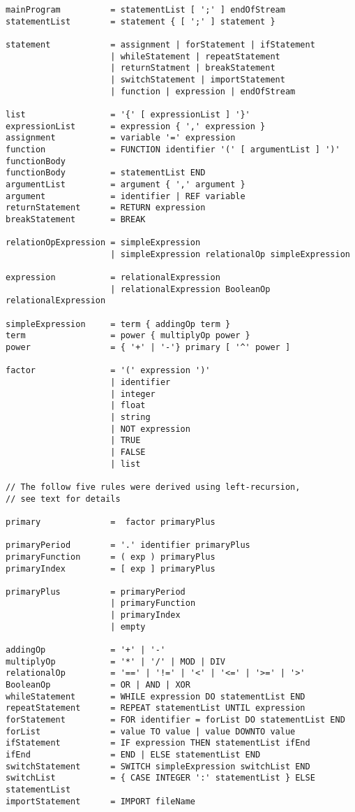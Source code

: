{\footnotesize
\begin{verbatim}
mainProgram          = statementList [ ';' ] endOfStream
statementList        = statement { [ ';' ] statement }

statement            = assignment | forStatement | ifStatement
                     | whileStatement | repeatStatement
                     | returnStatment | breakStatement
                     | switchStatement | importStatement
                     | function | expression | endOfStream

list                 = '{' [ expressionList ] '}'
expressionList       = expression { ',' expression }
assignment           = variable '=' expression
function             = FUNCTION identifier '(' [ argumentList ] ')' functionBody
functionBody         = statementList END
argumentList         = argument { ',' argument }
argument             = identifier | REF variable
returnStatement      = RETURN expression
breakStatement       = BREAK

relationOpExpression = simpleExpression
                     | simpleExpression relationalOp simpleExpression

expression           = relationalExpression
                     | relationalExpression BooleanOp relationalExpression

simpleExpression     = term { addingOp term }
term                 = power { multiplyOp power }
power                = { '+' | '-'} primary [ '^' power ]

factor               = '(' expression ')'
                     | identifier
                     | integer
                     | float
                     | string
                     | NOT expression
                     | TRUE
                     | FALSE
                     | list

// The follow five rules were derived using left-recursion,
// see text for details

primary              =  factor primaryPlus

primaryPeriod        = '.' identifier primaryPlus
primaryFunction      = ( exp ) primaryPlus
primaryIndex         = [ exp ] primaryPlus

primaryPlus          = primaryPeriod
                     | primaryFunction
                     | primaryIndex
                     | empty

addingOp             = '+' | '-'
multiplyOp           = '*' | '/' | MOD | DIV
relationalOp         = '==' | '!=' | '<' | '<=' | '>=' | '>'
BooleanOp            = OR | AND | XOR
whileStatement       = WHILE expression DO statementList END
repeatStatement      = REPEAT statementList UNTIL expression
forStatement         = FOR identifier = forList DO statementList END
forList              = value TO value | value DOWNTO value
ifStatement          = IF expression THEN statementList ifEnd
ifEnd                = END | ELSE statementList END
switchStatement      = SWITCH simpleExpression switchList END
switchList           = { CASE INTEGER ':' statementList } ELSE statementList
importStatement      = IMPORT fileName
\end{verbatim} }


